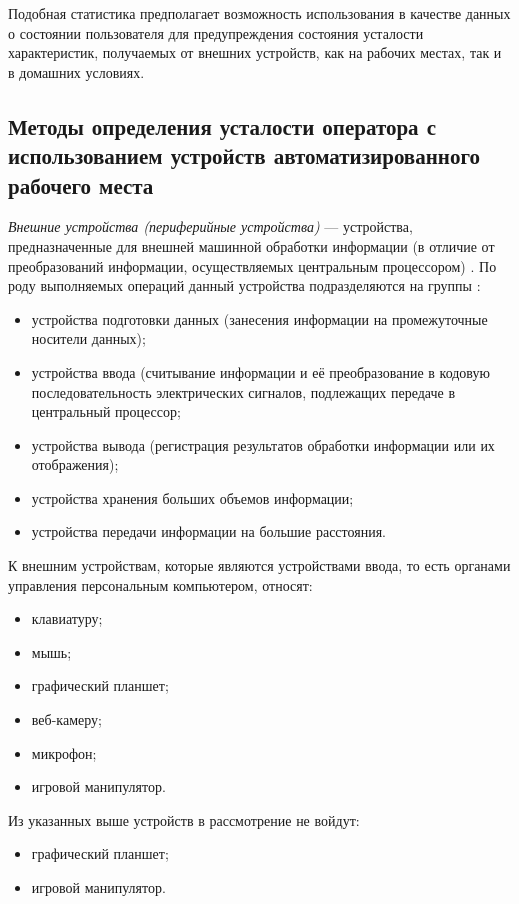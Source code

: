 Подобная статистика предполагает возможность использования в качестве данных о состоянии пользователя для предупреждения состояния усталости характеристик, получаемых от внешних устройств, как на рабочих местах, так и в домашних условиях.

\subsection{Методы определения усталости оператора с использованием устройств автоматизированного рабочего места}
\textit{Внешние устройства (периферийные устройства)} --- устройства, предназначенные для внешней машинной обработки информации (в отличие от преобразований информации, осуществляемых центральным процессором) \cite{polytechDic}. По роду выполняемых операций данный устройства подразделяются на группы \cite{polytechDic}: 
\begin{itemize}[leftmargin=1.6\parindent]
\item устройства подготовки данных (занесения информации на промежуточные носители данных);
\item устройства ввода (считывание информации и её преобразование в кодовую последовательность электрических сигналов, подлежащих передаче в центральный процессор;
\item устройства вывода (регистрация результатов обработки информации или их отображения);
\item устройства хранения больших объемов информации;
\item устройства передачи информации на большие расстояния.
\end{itemize}

К внешним устройствам, которые являются устройствами ввода, то есть органами управления персональным компьютером, относят:
\begin{itemize}[leftmargin=1.6\parindent]
\item клавиатуру;
\item мышь;
\item графический планшет;
\item веб-камеру;
\item микрофон;
\item игровой манипулятор.
\end{itemize}

Из указанных выше устройств в рассмотрение не войдут:
\begin{itemize}[leftmargin=1.6\parindent]
\item графический планшет;
\item игровой манипулятор.
\end{itemize}

